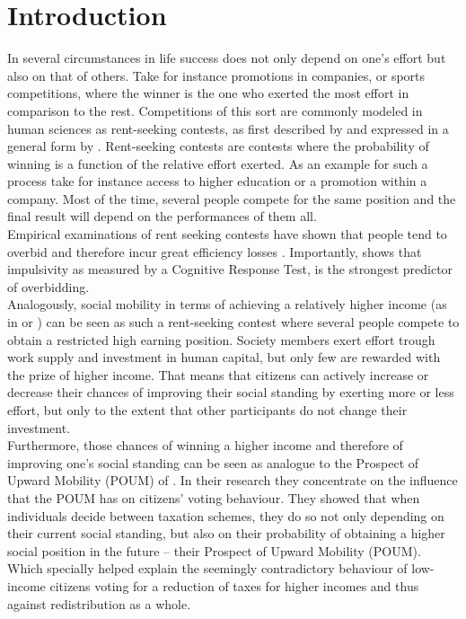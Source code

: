 \chapter{Introduction}
\thispagestyle{fancy}
\label{ch:intro}

In several circumstances in life success does not only depend on one's effort but also on that of others. Take for instance promotions in companies, or sports competitions, where the winner is the one who exerted the most effort in comparison to the rest. Competitions of this sort are commonly modeled in human sciences as rent-seeking contests, as first described by \cite{tullock1980}  and expressed in a general form by \cite{sheremeta2010a}. Rent-seeking contests are contests where the probability of winning is a function of the relative effort exerted. As an example for such a process take for instance access to higher education or a promotion within a company. Most of the time, several people compete for the same position and the final result will depend on the performances of them all.\\

Empirical examinations of rent seeking contests have shown that people tend to overbid and therefore incur great efficiency losses \citep{sheremeta2016, chowdhury2014, konrad2009, dechenaux2015}. Importantly, \cite{sheremeta2016} shows that impulsivity as measured by a Cognitive Response Test, is the strongest predictor of overbidding.\\

Analogously, social mobility in terms of achieving a relatively higher income (as in \cite{fields1996} or \cite{fields1999}) can be seen as such a rent-seeking contest where several people compete to obtain a restricted high earning position. Society members exert effort trough work supply and investment in human capital, but only few are rewarded with the prize of higher income. That means that citizens can actively increase or decrease their chances of improving their social standing by exerting more or less effort, but only to the extent that other participants do not change their investment.\\

Furthermore, those chances of winning a higher income and therefore of improving one's social standing can be seen as analogue to the Prospect of Upward Mobility (POUM) of \cite{benabou2001}. In their research they concentrate on the influence that the POUM has on citizens' voting behaviour. They showed that when individuals decide between taxation schemes, they do so not only depending on their current social standing, but also on their probability of obtaining a higher social position in the future -- their Prospect of Upward Mobility (POUM). Which specially helped explain the seemingly contradictory behaviour of low-income citizens voting for a reduction of taxes for higher incomes and thus against redistribution as a whole.\\

